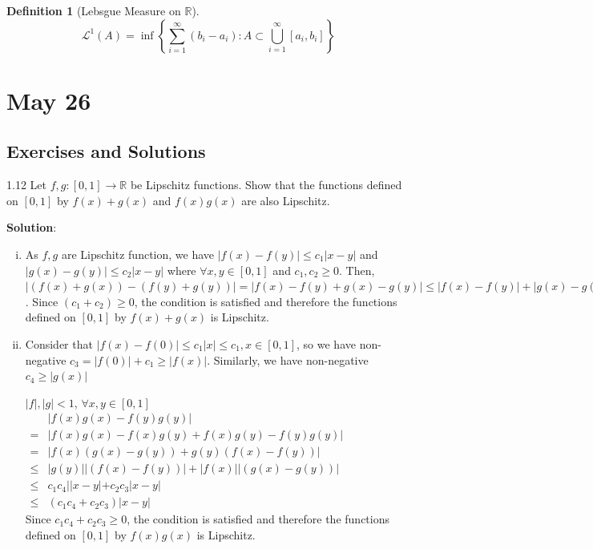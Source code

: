 \documentclass[12pt, a4paper]{article}
\newtheorem{definition}{Definition}[subsection]
\begin{document}
\begin{definition}[Lebsgue Measure on $\mathbb{R}$] 
    $$\mathcal{L}^{1}(A)=\inf \left\{\sum_{i=1}^{\infty}\left(b_{i}-a_{i}\right): A \subset \bigcup_{i=1}^{\infty}\left[a_{i}, b_{i}\right]\right\}$$
\end{definition}


\newpage
\section{May 26}
\subsection{Exercises and Solutions}
\begin{customexercise}{1.12}
    Let $f, g:[0,1] \rightarrow \mathbb{R}$ be Lipschitz functions. 
    Show that the functions defined on $[0,1]$ by $f(x)+g(x)$ and 
    $f(x) g(x)$ are also Lipschitz.
\end{customexercise}

\textbf{Solution}:  
\begin{enumerate}[(i)]
    \item As $f, g$ are Lipschitz function, we have $|f(x)-f(y)| \leq c_1|x-y|$ and $|g(x)-g(y)| \leq c_2|x-y|$  where $\forall x, y \in [0, 1]$ and $c_1, c_2 \geq 0$.
    Then, $|(f(x)+g(x)) - (f(y) + g(y))| = |f(x) - f(y) +g(x) - g(y)| \leq  |f(x) - f(y)| + |g(x) - g(y)|\leq (c_1 + c_2 )\cdot |x - y|, \forall x, y\in[0, 1] $. Since $(c_1+c_2)\geq 0$, the condition is satisfied and therefore
    the functions defined on $[0,1]$ by $f(x)+g(x)$ is Lipschitz. 
    \item Consider that $|f(x) -f(0)| \leq c_1 |x| \leq c_1, x\in[0, 1]$, so we have non-negative $c_3 = |f(0)| + c_1 \geq |f(x)|$. Similarly, 
    we have non-negative $c_4 \geq |g(x)|$
    
    $|f|, |g| < 1$, $\forall x, y\in[0, 1]$\\
    $\begin{aligned}
        &|f(x)g(x) - f(y)g(y)| \\
        =& |f(x)g(x) -f(x)g(y) + f(x)g(y)- f(y)g(y)| \\
        =& |f(x)(g(x) - g(y)) + g(y)(f(x) - f(y))| \\ 
        \leq& |g(y)||(f(x) - f(y))| + |f(x)||(g(x) - g(y))| \\
        \leq& c_1 c_4 ||x-y| + c_2 c_3|x-y| \\
        \leq& (c_1c_4 +c_2c_3) |x-y|
    \end{aligned}$\\
    Since $c_1c_4 +c_2c_3 \geq 0$, the condition is satisfied and therefore
    the functions defined on $[0,1]$ by $f(x)g(x)$ is Lipschitz.
\end{enumerate}
\end{document}
